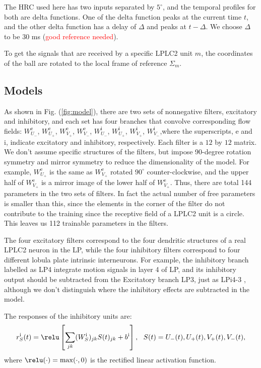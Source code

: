 The HRC used here has two inputs separated by $5^{\circ}$, and the temporal profiles for both are delta functions. One of the delta function peaks at the current time $t$, and the other delta function has a delay of $\Delta$ and peaks at $t-\Delta$. We choose $\Delta$ to be 30 ms (\textcolor{red}{good reference needed}).

To get the signals that are received by a specific LPLC2 unit $m$, the coordinates of the ball are rotated to the local frame of reference $\Sigma_{m}$. 

\subsection{Models}
As shown in Fig. (\ref{fig:model}), there are two sets of nonnegative filters, excitatory and inhibitory, and each set has four branches that convolve corresponding flow fields: $W^{\text{e}}_{U_{-}}$, $W^{\text{e}}_{U_{+}}$, $W^{\text{e}}_{V_{+}}$, $W^{\text{e}}_{V_{-}}$, $W^{\text{i}}_{U_{-}}$, $W^{\text{i}}_{U_{+}}$, $W^{\text{i}}_{V_{+}}$, $W^{\text{i}}_{V_{-}}$,where the superscripts, e and i, indicate excitatory and inhibitory, respectively. Each filter is a $12$ by $12$ matrix. We don't assume specific structures of the filters, but impose 90-degree rotation symmetry and mirror symmetry to reduce the dimensionality of the model. For example, $W^{\text{e}}_{U_{+}}$ is the same as $W^{\text{e}}_{V_{+}}$ rotated $90^{\circ}$ counter-clockwise, and the upper half of $W^{\text{e}}_{V_{+}}$ is a mirror image of the lower half of $W^{\text{e}}_{V_{+}}$. Thus, there are total 144 parameters in the two sets of filters. In fact the actual number of free parameters is smaller than this, since the elements in the corner of the filter do not contribute to the training since the receptive field of a LPLC2 unit is a circle. This leaves us 112 trainable parameters in the filters.
 
The four excitatory filters correspond to the four dendritic structures of a real LPLC2 neuron in the LP, while the four inhibitory filters correspond to four different lobula plate intrinsic interneurons. For example, the inhibitory branch labelled as LP4 integrate motion signals in layer 4 of LP, and its inhibitory output should be subtracted from the Excitatory branch LP3, just as LPi4-3 \citep{klapoetke2017ultra}, although we don't distinguish where the inhibitory effects are subtracted in the model. 

The responses of the inhibitory units are:
\begin{equation}
r^{\text{i}}_{S}(t) = \relu \left[ \sum_{jk}(W^{\text{i}}_{S})_{jk}S(t)_{jk}+b^{\text{i}} \right],\ \ S(t) = U_{-}(t), U_{+}(t), V_{+}(t), V_{-}(t),
\label{eq:inhibitory}
\end{equation}
where $\relu(\cdot) = \max(\cdot,0)$ is the rectified linear activation function.

